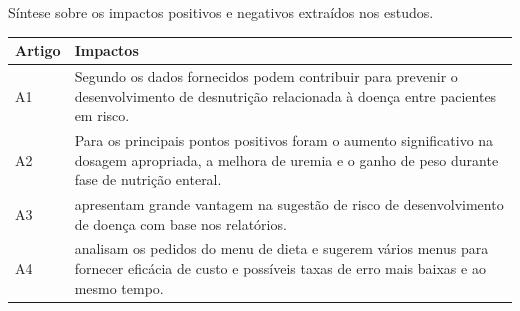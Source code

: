 \begin{quadro}[htb]
\caption{\label{quadro_ImpactosPositivos}Síntese sobre os impactos positivos e negativos extraídos nos estudos.}
\label{}
\begin{tabular}{|p{}|p{}|}
	\hline
	\textbf{Artigo}   &   \textbf{Impactos}\\ \hline
	A1  &  Segundo \citeonline{paulsen2018_1} os dados fornecidos podem contribuir para prevenir o desenvolvimento de desnutrição relacionada à doença entre pacientes em risco.\\ \hline
	A2  &  Para \citeonline{alrifai2017} os principais pontos positivos foram o aumento significativo na dosagem apropriada, a melhora de uremia e o ganho de peso durante fase de nutrição enteral.\\ \hline
	A3  &  \citeonline{cruz2017} apresentam grande vantagem na sugestão de risco de desenvolvimento de doença com base nos relatórios.\\ \hline
	A4  & \citeonline{ileri2019} analisam os pedidos do menu de dieta e sugerem vários menus para fornecer eficácia de custo e possíveis taxas de erro mais baixas e ao mesmo tempo.\\ \hline
\end{tabular}
\end{quadro}
\newpage
